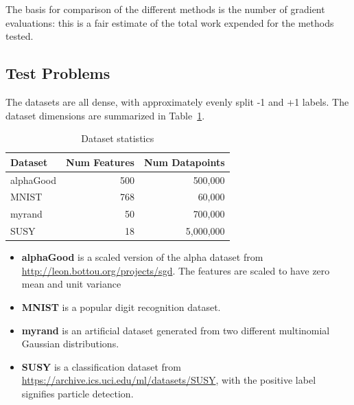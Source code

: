 \documentclass[11pt]{article}
\begin{document}
 The basis for comparison of the different methods is the number of gradient evaluations: this is a fair estimate of the total work expended for the methods tested.
 
 
   \subsection{Test Problems}

The datasets are all dense, with approximately evenly split -1 and +1 labels. The dataset dimensions are summarized in Table~\ref{table:sizes}.

\begin{table}[htb!]	%
	\centering
	\begin{tabular}{lrr}
		\toprule
		\textbf{Dataset} & \textbf{Num Features} & \textbf{Num Datapoints}\\
		\midrule
		             alphaGood &              500 &              500,000\\
		             MNIST &              768 &              60,000\\
		             myrand &              50 &              700,000\\
		             SUSY &              18 &              5,000,000\\
		\bottomrule
	\end{tabular}
	\caption{Dataset statistics}
	\label{table:sizes}
\end{table}

\begin{itemize}
	\item \textbf{alphaGood} is a scaled version of the alpha dataset from \url{http://leon.bottou.org/projects/sgd}. The features are scaled to have zero mean and unit variance
	\item \textbf{MNIST} is a popular digit recognition dataset.
	\item \textbf{myrand} is an artificial dataset generated from two different multinomial Gaussian distributions. 
	\item  \textbf{SUSY} is a classification dataset from \url{https://archive.ics.uci.edu/ml/datasets/SUSY}, with the positive label signifies particle detection. 
\end{itemize}


\end{document}
